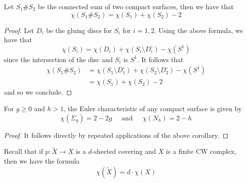 \documentclass[a4paper]{article}
\begin{document}
\begin{crl}{}{} Let $S_1\# S_2$ be the connected sum of two compact surfaces, then we have that $$\chi(S_1\# S_2)=\chi(S_1)+\chi(S_2)-2$$ \tcbline
\begin{proof}
Let $D_i$ be the gluing discs for $S_i$ for $i=1,2$. Using the above formula, we have that $$\chi(S_i)=\chi(D_i)+\chi(S_i\setminus D_i^\circ)-\chi(S^1)$$ since the intersection of the disc and $S_i$ is $S^1$. It follows that 
\begin{align*}
\chi(S_1\# S_2)&=\chi(S_1\setminus D_1^\circ)+\chi(S_2\setminus D_2^\circ)-\chi(S^1)\\
&=\chi(S_1)+\chi(S_2)-2
\end{align*}
and so we conclude. 
\end{proof}
\end{crl}

\begin{crl}{}{} For $g\geq 0$ and $h>1$, the Euler characteristic of any compact surface is given by $$\chi(\Sigma_g)=2-2g\;\;\;\;\text{ and }\;\;\;\;\chi(N_h)=2-h$$ \tcbline
\begin{proof}
It follows directly by repeated applications of the above corollary. 
\end{proof}
\end{crl}

Recall that if $p:\tilde{X}\to X$ is a $d$-sheeted covering and $X$ is a finite CW complex, then we have the formula $$\chi(\tilde{X})=d\cdot\chi(X)$$
\end{document}
